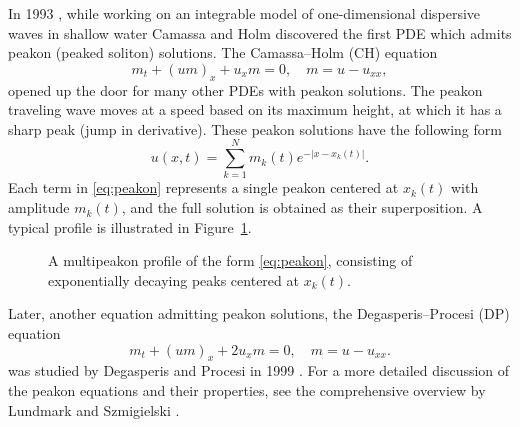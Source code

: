 \documentclass[english,master]{liumaiex}
\theoremstyle{thesisplain}
\theoremstyle{thesisdefinition}
\numberwithin{equation}{section}
\begin{document}
In 1993 \cite{Camassa_1993}, while working on an integrable model of one-dimensional dispersive waves in shallow water Camassa and Holm discovered the first PDE which admits peakon (peaked soliton) solutions. The Camassa--Holm (CH) equation
\begin{equation} \label{eq:CH}
	m_t + (um)_x + u_xm = 0,\quad m = u - u_{xx},
\end{equation}
opened up the door for many other PDEs with peakon solutions. The peakon traveling wave moves at a speed based on its maximum height, at which
it has a sharp peak (jump in derivative). These peakon solutions have the following form
\begin{equation} \label{eq:peakon}
	u(x, t) = \sum_{k = 1}^{N} m_k(t) e^{-|x - x_k(t)|}.
\end{equation}
Each term in \eqref{eq:peakon} represents a single peakon centered at $x_k(t)$ with amplitude $m_k(t)$, and the full solution is obtained as their superposition. A typical profile is illustrated in Figure~\ref{fig:peakon-profile}.
\begin{figure}[H]
\centering
{}
\caption{A multipeakon profile of the form \eqref{eq:peakon}, consisting of exponentially decaying peaks centered at $x_k(t)$.}
\label{fig:peakon-profile}
\end{figure}

Later, another equation admitting peakon solutions, the Degasperis--Procesi (DP) equation
\begin{equation} \label{eq:DP}
	m_t + (um)_x + 2u_xm = 0,\quad m = u - u_{xx}.
\end{equation}
was studied by Degasperis and Procesi in 1999 \cite{Degasperis_1999}. For a more detailed discussion of the peakon equations and their properties, see the comprehensive overview by Lundmark and Szmigielski \cite{Lundmark_2022}.
\end{document}
